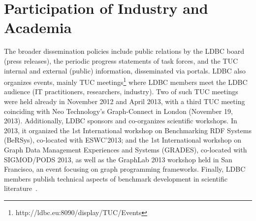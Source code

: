 

\section{Participation of Industry and Academia}


The broader dissemination policies include public relations by the LDBC
board (\eg press releases), the periodic progress
statements of task forces, and the TUC internal
and external (public) information, disseminated via
portals. LDBC also organizes events, mainly TUC
meetings\footnote{http://ldbc.eu:8090/display/TUC/Events}
where LDBC members meet the LDBC
audience (IT practitioners, researchers, industry).
Two of such TUC meetings were held already in
November 2012 and April 2013, with a third TUC
meeting coinciding with Neo Technology's Graph-Connect in London (November 19, 2013).
Additionally, LDBC sponsors and co-organizes scientific
workshops. In 2013, it organized the 1st International
workshop on Benchmarking RDF Systems
(BeRSys), co-located with ESWC'2013; and the 1st
International workshop on Graph Data Management
Experiences and Systems (GRADES), co-located with
SIGMOD/PODS 2013, as well as the GraphLab
2013 workshop held in San Francisco, an event
focusing on graph programming frameworks. Finally,
LDBC members publish technical aspects of benchmark
development in scientific literature~\cite{angles2013benchmarking,boncz2013tpch,cattuto2013time,gubichev2013sparqling}.





